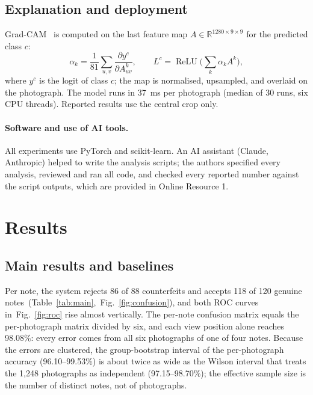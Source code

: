 \documentclass[pdflatex,sn-mathphys-num]{sn-jnl}
\begin{document}
\subsection{Explanation and deployment}\label{sec:deploy}

Grad-CAM~\cite{selvaraju2017gradcam} is computed on the last feature map
$A\in\mathbb{R}^{1280\times9\times9}$ for the predicted class $c$:
\begin{equation}
\alpha_k = \frac{1}{81}\sum_{u,v}\frac{\partial y^{c}}{\partial A^{k}_{uv}},\qquad
L^{c} = \operatorname{ReLU}\!\Big(\sum_{k}\alpha_k A^{k}\Big),
\label{eq:gradcam}
\end{equation}
where $y^c$ is the logit of class $c$; the map is normalised, upsampled, and overlaid on
the photograph. The model runs in 37~ms per photograph (median of 30 runs, six CPU
threads). Reported results use the central crop only.

\paragraph{Software and use of AI tools.} All experiments use PyTorch and
scikit-learn. An AI assistant (Claude, Anthropic) helped to write the analysis scripts;
the authors specified every analysis, reviewed and ran all code, and checked every
reported number against the script outputs, which are provided in Online Resource 1.

\section{Results}\label{sec:results}

\subsection{Main results and baselines}\label{sec:main}

Per note, the system rejects 86 of 88 counterfeits and accepts 118 of 120 genuine notes~(Table~\ref{tab:main},~Fig.~\ref{fig:confusion}), and both ROC curves in~Fig.~\ref{fig:roc} rise almost vertically. The per-note confusion matrix equals the
per-photograph matrix divided by six, and each view position alone reaches 98.08\%:
every error comes from all six photographs of one of four notes. Because the errors are
clustered, the group-bootstrap interval of the per-photograph accuracy (96.10--99.53\%)
is about twice as wide as the Wilson interval that treats the 1{,}248 photographs as
independent (97.15--98.70\%); the effective sample size is the number of distinct notes,
not of photographs.
\end{document}
